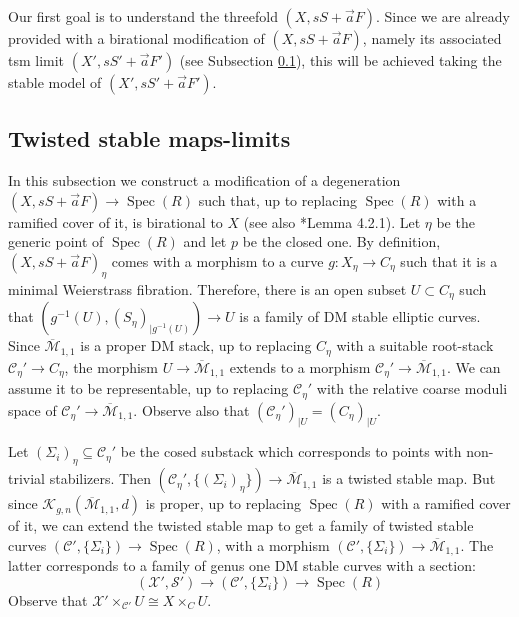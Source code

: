 \documentclass[11pt]{amsart}
\newcommand{\sC}{\mathscr{C}}
\newcommand{\sS}{\mathscr{S}}
\newcommand{\sX}{\mathscr{X}}
\newcommand{\spec}{\operatorname{Spec}}
\theoremstyle{definition}
\begin{document}
Our first goal is to understand the threefold $(X,sS+\vec{a}F)$. Since we are already
provided with a birational modification of $(X,sS+\vec{a}F)$, namely its associated tsm limit
$(X',sS'+\vec{a}F')$ (see Subsection \ref{subsection:definition:tsm:limit}),
this will be achieved taking the stable model of $(X',sS'+\vec{a}F')$. 

\subsection{Twisted stable maps-limits}\label{subsection:definition:tsm:limit}
In this subsection we construct a modification of a degeneration $(X,sS+\vec{a}F) \to \spec(R)$ such that,
up to replacing $\spec(R)$ with a ramified cover of it, is birational to $X$ (see also \cite{LaNave}*{Lemma 4.2.1}).
Let $\eta$ be the generic point of $\spec(R)$ and let $p$ be the closed one. By definition,
$(X,sS+\vec{a}F)_\eta$ comes with a morphism to a curve $g:X_\eta \to C_\eta$ such that it is a minimal Weierstrass fibration.
Therefore, there is an open subset $U \subset C_\eta$ such that $(g^{-1}(U),(S_\eta)_{|g^{-1}(U)}) \to U$ is a family of DM stable 
elliptic curves. Since $\overline{\mathcal{M}}_{1,1}$ is a proper DM stack, up to replacing $C_\eta$ with a suitable root-stack
$\sC_\eta' \to C_\eta$, the morphism $U \to \overline{\mathcal{M}}_{1,1}$ extends to a morphism $\sC_\eta' \to \overline{\mathcal{M}}_{1,1}$.
We can assume it to be representable, up to replacing $\sC_\eta'$ with the relative coarse moduli space of $\sC_\eta' \to \overline{\mathcal{M}}_{1,1}$.
Observe also that $(\sC_\eta')_{|U}=(C_\eta)_{|U}$.

Let $(\Sigma_i)_\eta \subseteq \sC_\eta'$ be the cosed substack which corresponds to points with non-trivial stabilizers.
Then $(\sC_\eta', \{(\Sigma_i)_\eta \}) \to \overline{\mathcal{M}}_{1,1}$
is a twisted stable map. But since $\mathcal{K}_{g,n}(\overline{\mathcal{M}}_{1,1},d)$ is proper, up to replacing $\spec(R)$ with
a ramified cover of it, we can extend the twisted stable map to get a family of twisted stable curves $(\sC', \{\Sigma_i\}) \to \spec(R)$, with
a morphism
$(\sC', \{\Sigma_i\}) \to \overline{\mathcal{M}}_{1,1}$. The latter corresponds to a family of genus one DM stable curves with a section:
$$(\sX', \sS') \to (\sC', \{\Sigma_i\}) \to \spec(R)$$
Observe that $\sX'\times_{\sC'}U \cong X\times_C U$.
\end{document}
